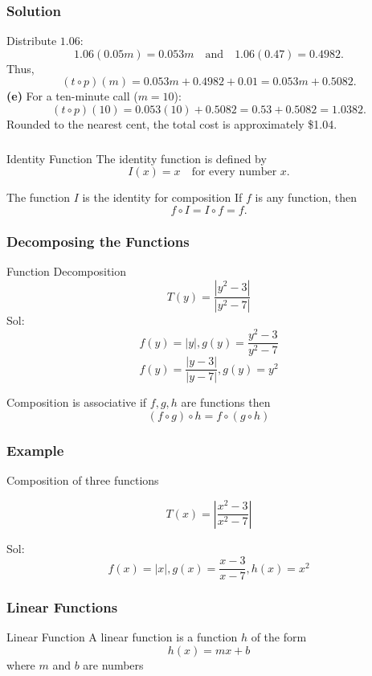   \begin{frame}
    \frametitle{Solution}
    Distribute \(1.06\):
    \[
    1.06(0.05m)=0.053m \quad \text{and} \quad 1.06(0.47)=0.4982.
    \]
    Thus,
    \[
    (t \circ p)(m)=0.053m+0.4982+0.01=0.053m+0.5082.
    \]
    \textbf{(e)} For a ten-minute call (\(m=10\)):
    \[
    (t \circ p)(10)=0.053(10)+0.5082=0.53+0.5082=1.0382.
    \]
    Rounded to the nearest cent, the total cost is approximately \$1.04.
  \end{frame}
  \begin{frame}
    \frametitle{}
    \begin{block}{Identity Function}
      The identity function is defined by
      \[
      I(x) = x \quad \text{for every number } x.
      \]
      \end{block}

      \begin{alertblock}{The function \(I\) is the identity for composition}
        If \(f\) is any function, then
        \[
        f \circ I = I \circ f = f.
        \]
        \end{alertblock}
  \end{frame}
\begin{frame}
  \frametitle{Decomposing the Functions}
  \begin{exampleblock}{Function Decomposition}
    \[
    T(y) = \frac{|y^{2} -3|}{|y^{2} - 7|}
    \]
    Sol: \pause
    \medskip 
    \[f(y) = |y|, g(y) = \frac{y^{2}-3}{y^{2}-7} \]
    \[ f(y) = \frac{|y-3|}{|y-7|}, g(y) = y^{2}\]
  \end{exampleblock}
  \begin{alertblock}{Composition is associative}
    if \(f,g, h\) are functions then 
    \[(f \circ g) \circ h  = f \circ (g \circ h) \]
  \end{alertblock}
\end{frame}
\begin{frame}
  \frametitle{Example}
  \begin{exampleblock}{Composition of three functions}

    \[T(x) = \left| \frac{x^{2}-3}{x^{2} - 7}  \right| \]

    Sol: \pause
     \[f(x) = |x|, g(x) = \frac{x-3}{x-7}, h(x) = x^{2}\]
    
  \end{exampleblock}
\end{frame}
\begin{frame}
  \frametitle{Linear Functions}
  \begin{block}{Linear Function}
    A linear function is a function \(h\) of the form 
    \[h(x) = mx + b\]
    where \(m\) and \(b\) are numbers
  \end{block}
\end{frame}

